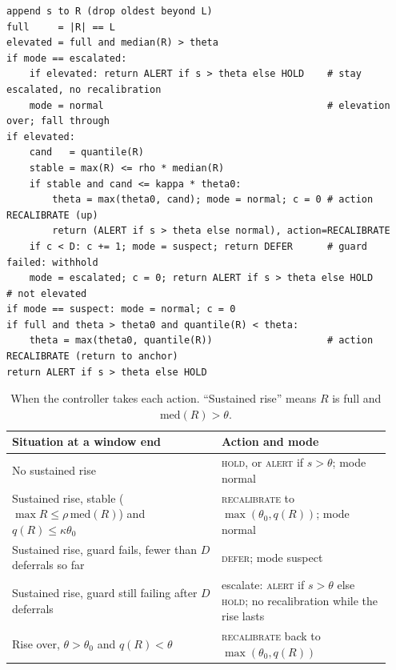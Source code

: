 \begin{lstlisting}[style=ctrl, caption={The frozen controller, transcribed exactly from the protocol. \texttt{quantile} is nearest rank; \texttt{median} is the ordinary median.}, label={lst:ctrl}, captionpos=b]
append s to R (drop oldest beyond L)
full     = |R| == L
elevated = full and median(R) > theta
if mode == escalated:
    if elevated: return ALERT if s > theta else HOLD    # stay escalated, no recalibration
    mode = normal                                       # elevation over; fall through
if elevated:
    cand   = quantile(R)
    stable = max(R) <= rho * median(R)
    if stable and cand <= kappa * theta0:
        theta = max(theta0, cand); mode = normal; c = 0 # action RECALIBRATE (up)
        return (ALERT if s > theta else normal), action=RECALIBRATE
    if c < D: c += 1; mode = suspect; return DEFER      # guard failed: withhold
    mode = escalated; c = 0; return ALERT if s > theta else HOLD
# not elevated
if mode == suspect: mode = normal; c = 0
if full and theta > theta0 and quantile(R) < theta:
    theta = max(theta0, quantile(R))                    # action RECALIBRATE (return to anchor)
return ALERT if s > theta else HOLD
\end{lstlisting}

\begin{table}[H]
  \centering
  \caption{When the controller takes each action. ``Sustained rise'' means $R$ is full
  and $\mathrm{med}(R) > \theta$.}
  \label{tab:actions}
  \footnotesize
  \begin{tabular}{@{}p{0.52\linewidth}p{0.42\linewidth}@{}}
    \toprule
    Situation at a window end & Action and mode \\
    \midrule
    No sustained rise & \textsc{hold}, or \textsc{alert} if $s > \theta$; mode normal \\
    Sustained rise, stable ($\max R \le \rho\,\mathrm{med}(R)$) and $q(R) \le \kappa\theta_0$
      & \textsc{recalibrate} to $\max(\theta_0, q(R))$; mode normal \\
    Sustained rise, guard fails, fewer than $D$ deferrals so far & \textsc{defer}; mode suspect \\
    Sustained rise, guard still failing after $D$ deferrals
      & escalate: \textsc{alert} if $s>\theta$ else \textsc{hold}; no recalibration while
      the rise lasts \\
    Rise over, $\theta > \theta_0$ and $q(R) < \theta$ & \textsc{recalibrate} back to
      $\max(\theta_0, q(R))$ \\
    \bottomrule
  \end{tabular}
\end{table}

